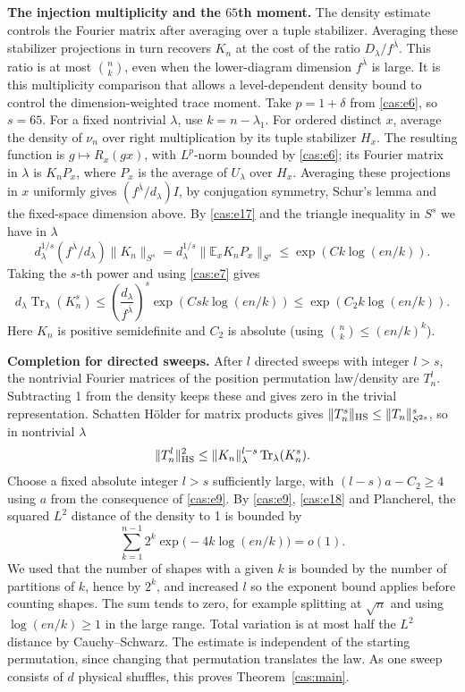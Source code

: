 \medskip\noindent\textbf{The injection multiplicity and the $65$th moment.}\enspace
The density estimate controls the Fourier matrix after averaging over
a tuple stabilizer. Averaging these stabilizer projections in turn
recovers $K_n$ at the cost of the ratio $D_\lambda/f^{\bar\lambda}$.
This ratio is at most $\binom nk$, even when the lower-diagram dimension
$f^{\bar\lambda}$ is large. It is this multiplicity comparison that
allows a level-dependent density bound to control the dimension-weighted
trace moment.
Take \(p=1+\delta\) from \eqref{cas:e6}, so \(s=65\). For a fixed nontrivial \(\lambda\), use \(k=n-\lambda_1\). For ordered distinct \(x\), average the density of \(\nu_n\) over right multiplication by its tuple stabilizer \(H_x\). The resulting function is \(g\mapsto R_x(g x)\), with \(L^p\)-norm bounded by \eqref{cas:e6}; its Fourier matrix in \(\lambda\) is \(K_n P_x\), where \(P_x\) is the average of \(U_\lambda\) over \(H_x\). Averaging these projections in \(x\) uniformly gives \((f^{\bar\lambda}/d_\lambda)I\), by conjugation symmetry, Schur's lemma and the fixed-space dimension above. By \eqref{cas:e17} and the triangle inequality in \(S^s\) we have in \(\lambda\)
\[
d_\lambda^{1/s}(f^{\bar\lambda}/d_\lambda)\|K_n\|_{S^s}
=d_\lambda^{1/s}\|\mathbb E_x K_n P_x\|_{S^s}
\le \exp(C k\log(e n/k)).
\]
Taking the \(s\)-th power and using \eqref{cas:e7} gives
\begin{equation}
d_\lambda \operatorname{Tr}_\lambda(K_n^s)
\le \left(\frac{d_\lambda}{f^{\bar\lambda}}\right)^s
       \exp(C s k\log(e n/k))
\le \exp(C_2 k\log(e n/k)).
\label{cas:e18}
\end{equation}
Here \(K_n\) is positive semidefinite and \(C_2\) is absolute (using \(\binom{n}{k}\le(e n/k)^k\)).

\medskip\noindent\textbf{Completion for directed sweeps.}\enspace
After \(l\) directed sweeps with integer \(l>s\), the nontrivial Fourier matrices of the position permutation law/density are \(T_n^l\). Subtracting 1 from the density keeps these and gives zero in the trivial representation. Schatten Hölder for matrix products gives \(\|T_n^s\|_{\rm HS}\le\|T_n\|_{S^{2s}}^s\), so in nontrivial \(\lambda\)
\[
\|T_n^l\|_{\rm HS}^2\le
\|K_n\|_\lambda^{l-s}\operatorname{Tr}_\lambda(K_n^s).
\]
Choose a fixed absolute integer \(l>s\) sufficiently large, with \((l-s)a-C_2\ge 4\) using \(a\) from the consequence of \eqref{cas:e9}. By \eqref{cas:e9}, \eqref{cas:e18} and Plancherel, the squared \(L^2\) distance of the density to 1 is bounded by
\[
\sum_{k=1}^{n-1} 2^k \exp\big(-4 k\log(e n/k)\big)=o(1).
\]
We used that the number of shapes with a given \(k\) is bounded by the number of partitions of \(k\), hence by \(2^k\), and increased \(l\) so the exponent bound applies before counting shapes. The sum tends to zero, for example splitting at \(\sqrt n\) and using \(\log(e n/k)\ge1\) in the large range. Total variation is at most half the \(L^2\) distance by Cauchy--Schwarz. The estimate is independent of the starting permutation, since changing
that permutation translates the law.  As one sweep consists of $d$
physical shuffles, this proves Theorem~\ref{cas:main}.
